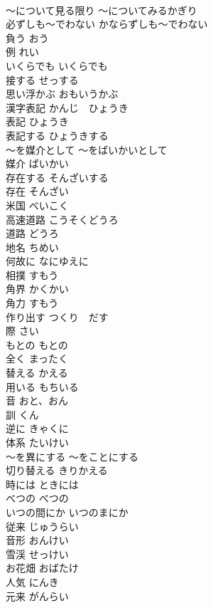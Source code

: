 \documentclass[8pt]{extreport}
\begin{document}
\begin{CJK}{UTF8}{min}
\\	〜について見る限り	〜についてみるかぎり	
\\	必ずしも〜でわない	かならずしも〜でわない	
\\	負う	おう	
\\	例	れい	
\\	いくらでも	いくらでも	
\\	接する	せっする	
\\	思い浮かぶ	おもいうかぶ	
\\	漢字表記	かんじ　ひょうき	
\\	表記	ひょうき	
\\	表記する	ひょうきする	
\\	〜を媒介として	〜をばいかいとして	
\\	媒介	ばいかい	
\\	存在する	そんざいする	
\\	存在	そんざい	
\\	米国	べいこく	
\\	高速道路	こうそくどうろ	
\\	道路	どうろ	
\\	地名	ちめい	
\\	何故に	なにゆえに	
\\	相撲	すもう	
\\	角界	かくかい	
\\	角力	すもう
\\	作り出す	つくり　だす	
\\	際	さい	
\\	もとの	もとの	
\\	全く	まったく	
\\	替える	かえる	
\\	用いる	もちいる	
\\	音	おと、おん	
\\	訓	くん	
\\	逆に	きゃくに	
\\	体系	たいけい	
\\	〜を異にする	〜をことにする	
\\	切り替える	きりかえる	
\\	時には	ときには	
\\	べつの	べつの	
\\	いつの間にか	いつのまにか	
\\	従来	じゅうらい	
\\	音形	おんけい	
\\	雪渓	せっけい	
\\	お花畑	おばたけ	
\\	人気	にんき	
\\	元来	がんらい	

\end{CJK}
\end{document}
